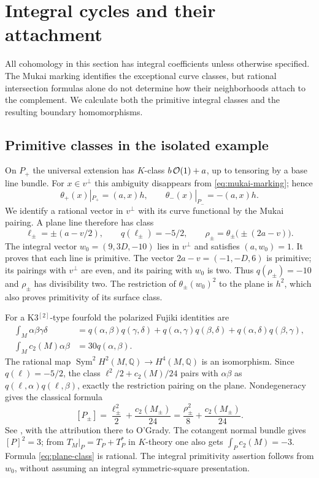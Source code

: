 \section{Integral cycles and their attachment}\label{sec:integral-attachments}

All cohomology in this section has integral coefficients
unless otherwise specified. The Mukai marking identifies
the exceptional curve classes, but rational intersection
formulas alone do not determine how their neighborhoods
attach to the complement. We calculate both the primitive
integral classes and the resulting boundary homomorphisms.

\subsection{Primitive classes in the isolated example}
On $P_+$ the universal extension has $K$-class
$b\,\mathcal O(1)+a$, up to tensoring by a base line bundle.
For $x\in v^\perp$ this ambiguity disappears from
\eqref{eq:mukai-marking}; hence
\[
 \theta_+(x)|_{P_+}=(a,x)h,\qquad
 \theta_-(x)|_{P_-}=-(a,x)h.
\]
We identify a rational vector in $v^\perp$ with its
curve functional by the Mukai pairing. A plane line
therefore has class
\begin{equation}\label{eq:isolated-classes}
 \ell_\pm=\pm(a-v/2),\qquad q(\ell_\pm)=-5/2,
 \qquad \rho_\pm=\theta_\pm\bigl(\pm(2a-v)\bigr).
\end{equation}
The integral vector $w_0=(9,3D,-10)$ lies in $v^\perp$
and satisfies $(a,w_0)=1$. It proves that each line
is primitive. The vector $2a-v=(-1,-D,6)$ is primitive;
its pairings with $v^\perp$ are even, and its pairing
with $w_0$ is two. Thus $q(\rho_\pm)=-10$ and
$\rho_\pm$ has divisibility two. The restriction of
$\theta_\pm(w_0)^2$ to the plane is $h^2$, which
also proves primitivity of its surface class.

For a K3$^{[2]}$-type fourfold the polarized Fujiki
identities are
\begin{equation}\label{eq:fujiki}
 \begin{aligned}
 \int_M\alpha\beta\gamma\delta
 &=q(\alpha,\beta)q(\gamma,\delta)
   +q(\alpha,\gamma)q(\beta,\delta)
   +q(\alpha,\delta)q(\beta,\gamma),\\
 \int_M c_2(M)\alpha\beta&=30q(\alpha,\beta).
 \end{aligned}
\end{equation}
The rational map $\operatorname{Sym}^2H^2(M,\mathbb Q)
\to H^4(M,\mathbb Q)$ is an isomorphism. Since
$q(\ell)=-5/2$, the class $\ell^2/2+c_2(M)/24$
pairs with $\alpha\beta$ as
$q(\ell,\alpha)q(\ell,\beta)$, exactly the
restriction pairing on the plane. Nondegeneracy gives
the classical formula
\begin{equation}\label{eq:plane-class}
 [P_\pm]=\frac{\ell_\pm^2}{2}+\frac{c_2(M_\pm)}{24}
         =\frac{\rho_\pm^2}{8}+\frac{c_2(M_\pm)}{24}.
\end{equation}
See \cite{hassetttschinkel}, with the attribution
there to O'Grady. The cotangent normal bundle gives
$[P]^2=3$; from $T_M|_P=T_P+T^*_P$ in $K$-theory
one also gets $\int_Pc_2(M)=-3$. Formula
\eqref{eq:plane-class} is rational. The integral
primitivity assertion follows from $w_0$, without
assuming an integral symmetric-square presentation.

